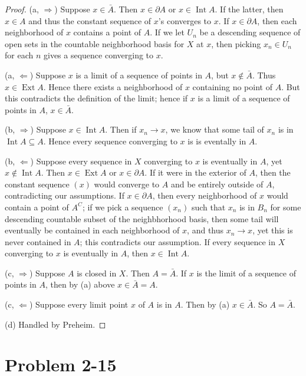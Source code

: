 \documentclass{article}
\theoremstyle{definition}
\begin{document}
\begin{proof}
(a, $\Rightarrow$)
Suppose $x \in \bar{A}$. Then $x \in \partial A$ or $x \in \operatorname{Int} A$.
If the latter, then $x \in A$ and thus the constant sequence of $x$'s converges
to $x$. If $x \in \partial A$, then each neighborhood of $x$ contains a point of 
$A$. If we let $U_n$ be a descending sequence of open sets in the countable
neighborhood basis for $X$ at $x$, then picking $x_n \in U_n$ for each $n$ 
gives a sequence converging to $x$.

(a, $\Leftarrow$) Suppose $x$ is a limit of a sequence of points in $A$, 
but $x \not\in \bar{A}$. Thus $x \in \operatorname{Ext} A$. Hence there
exists a neighborhood of $x$ containing no point of $A$. But this contradicts
the definition of the limit; hence if $x$ is a limit of a sequence
of points in $A$, $x \in \bar{A}$.

(b, $\Rightarrow$) Suppose $x \in \operatorname{Int} A$. Then if $x_n \to x$, 
we know that some tail of $x_n$ is in $\operatorname{Int} A \subseteq A$.
Hence every sequence converging to $x$ is is eventally in $A$.

(b, $\Leftarrow$) Suppose every sequence in $X$ converging to $x$ is eventually
in $A$, yet $x \not\in \operatorname{Int} A$. Then $x \in \operatorname{Ext} A$
or $x \in \partial A$. If it were in the exterior of $A$, then the constant
sequence $(x)$ would converge to $A$ and be entirely outside of $A$, contradicting
our assumptions. If $x \in \partial A$, then every neighborhood of $x$ would contain
a point of $A^C$; if we pick a sequence $(x_n)$ such that $x_n$ is in $B_n$ for some
descending countable subset of the neighbhorhood basis, then some tail will eventually
be contained in each neighborhood of $x$, and thus $x_n \to x$, yet this is never
contained in $A$; this contradicts our assumption. If every sequence in $X$ converging
to $x$ is eventually in $A$, then $x \in \operatorname{Int} A$.

(c, $\Rightarrow$) Suppose $A$ is closed in $X$. Then $A = \bar{A}$. If $x$ is the limit
of a sequence of points in $A$, then by (a) above $x \in \bar{A} = A$.

(c, $\Leftarrow$) Suppose every limit point $x$ of $A$ is in $A$. Then by (a) 
$x \in \bar{A}$. So $A = \bar{A}$.

(d) Handled by Preheim.
\end{proof}
\section{Problem 2-15}
\end{document}
